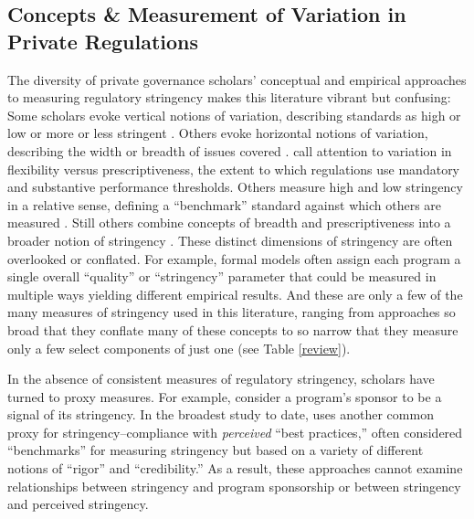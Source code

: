 \documentclass[
      12pt,
            Review ]{article}
\begin{document}
\hypertarget{concepts-measurement-of-variation-in-private-regulations}{%
\subsection{Concepts \& Measurement of Variation in Private Regulations}\label{concepts-measurement-of-variation-in-private-regulations}}

The diversity of private governance scholars' conceptual and empirical approaches to measuring regulatory stringency makes this literature vibrant but confusing: Some scholars evoke vertical notions of variation, describing standards as high or low or more or less stringent \citep{Fischer2014, Li2015}. Others evoke horizontal notions of variation, describing the width or breadth of issues covered \citep{Auld2014, Heyes2017}. \citet{Cashore2007} call attention to variation in flexibility versus prescriptiveness, the extent to which regulations use mandatory and substantive performance thresholds. Others measure high and low stringency in a relative sense, defining a ``benchmark'' standard against which others are measured \citep{Overdevest2005, Overdevest2010}. Still others combine concepts of breadth and prescriptiveness into a broader notion of stringency \citep{Fransen2011}. These distinct dimensions of stringency are often overlooked or conflated. For example, formal models often assign each program a single overall ``quality'' or ``stringency'' parameter that could be measured in multiple ways yielding different empirical results. And these are only a few of the many measures of stringency used in this literature, ranging from approaches so broad that they conflate many of these concepts to so narrow that they measure only a few select components of just one (see Table \ref{review}).



In the absence of consistent measures of regulatory stringency, scholars have turned to proxy measures. For example, \citet{Darnall2010} consider a program's sponsor to be a signal of its stringency. In the broadest study to date, \citet{VanderVen2015} uses another common proxy for stringency--compliance with \emph{perceived} ``best practices,'' often considered ``benchmarks'' for measuring stringency but based on a variety of different notions of ``rigor'' and ``credibility.'' As a result, these approaches cannot examine relationships between stringency and program sponsorship or between stringency and perceived stringency.
\end{document}
